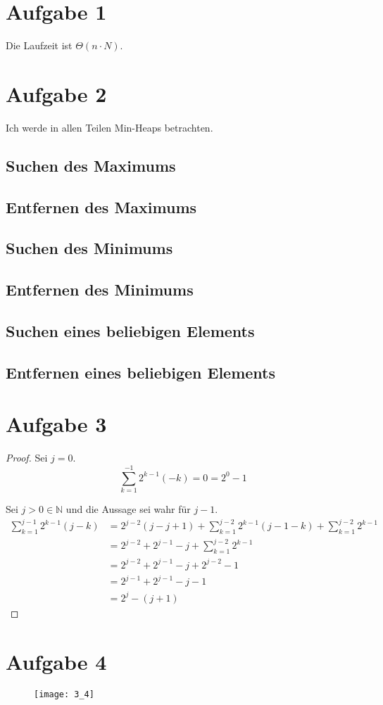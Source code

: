 \documentclass[10pt,a4paper]{article}
\begin{document}
\section{Aufgabe 1}
Die Laufzeit ist $\Theta(n \cdot N)$.

\section{Aufgabe 2}
Ich werde in allen Teilen Min-Heaps betrachten.

\subsection{Suchen des Maximums}

\subsection{Entfernen des Maximums}

\subsection{Suchen des Minimums}

\subsection{Entfernen des Minimums}

\subsection{Suchen eines beliebigen Elements}

\subsection{Entfernen eines beliebigen Elements}

\section{Aufgabe 3}
\begin{proof}
  Sei $j = 0$.
  \begin{equation}
    \sum_{k = 1}^{-1} 2^{k - 1} (-k) = 0 = 2^{0} - 1
  \end{equation}
  
  Sei $j > 0 \in \mathbb{N}$ und die Aussage sei wahr für $j - 1$.
  \begin{align*}
    \sum_{k = 1}^{j - 1} 2^{k - 1} (j - k) & = 2^{j - 2} (j - j + 1) + \sum_{k = 1}^{j - 2} 2^{k - 1} (j - 1 - k) + \sum_{k = 1}^{j - 2} 2^{k - 1}\\
    & = 2^{j - 2} + 2^{j - 1} - j + \sum_{k = 1}^{j - 2} 2^{k - 1}\\
    & = 2^{j - 2} + 2^{j - 1} - j + 2^{j - 2} - 1\\
    & = 2^{j - 1} + 2^{j - 1} - j - 1\\
    & = 2^{j} - (j + 1)
  \end{align*}
\end{proof}

\section{Aufgabe 4}

\begin{figure}[H]
  \texttt{[image: 3\_4]}
\end{figure}
\end{document}
